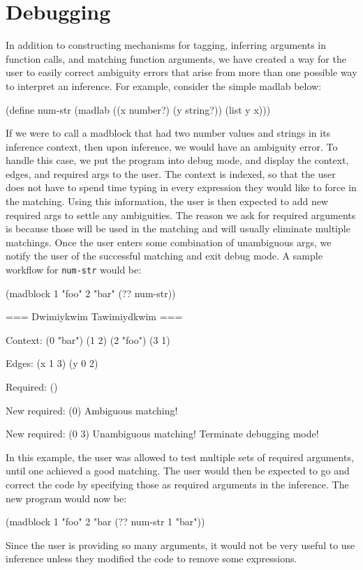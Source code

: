 \documentclass[11pt]{article}
\begin{document}
\section{Debugging}\label{debugging}

In addition to constructing mechanisms for tagging,
inferring arguments in function calls, and matching function arguments,
we have created a way for the user to easily correct ambiguity errors
that arise from more than one possible way to interpret an inference.
For example, consider the simple madlab below:
\begin{verbbox}
(define num-str
 (madlab ((x number?) (y string?))
         (list y x)))
\end{verbbox}
\begin{quote}\theverbbox\end{quote}
If we were to call a madblock that had two number values and strings
in its inference context,
then upon inference, we would have an ambiguity error.
To handle this case, we put the program into debug mode,
and display the context, edges, and required args to the user.
The context is indexed, so that the user does not have to spend time
typing in every expression they would like to force in the matching.
Using this information, the user is then expected to add new required args
to settle any ambiguities.
The reason we ask for required arguments is because those will be used
in the matching and will usually eliminate multiple matchings.
Once the user enters some combination of unambiguous args,
we notify the user of the successful matching and exit debug mode.
A sample workflow for \texttt{num-str} would be:
\begin{verbbox}
(madblock
 1
 "foo"
 2
 "bar"
 (?? num-str))

=== Dwimiykwim Tawimiydkwim ===

Context:
(0 "bar")
(1 2)
(2 "foo")
(3 1)

Edges:
(x 1 3)
(y 0 2)

Required:
()

New required:
(0)
Ambiguous matching!

New required:
(0 3)
Unambiguous matching! Terminate debugging mode!
\end{verbbox}
\begin{quote}\theverbbox\end{quote}
In this example, the user was allowed to test multiple sets of required
arguments, until one achieved a good matching.
The user would then be expected to go and correct the code
by specifying those as required arguments in the inference.
The new program would now be:
\begin{verbbox}
(madblock
 1
 "foo"
 2
 "bar
 (?? num-str 1 "bar"))
\end{verbbox}
\begin{quote}\theverbbox\end{quote}
Since the user is providing so many arguments, it would not be very useful
to use inference unless they modified the code to remove some expressions.
\end{document}
